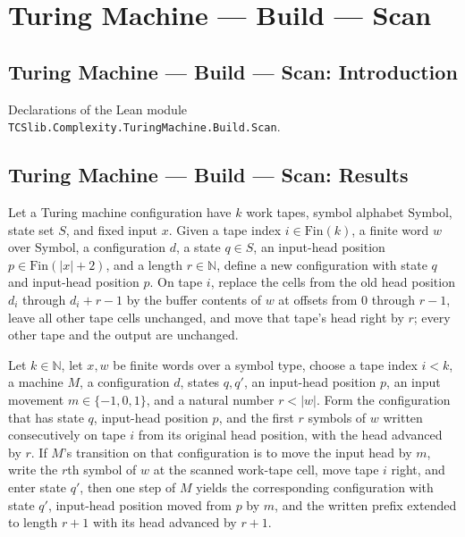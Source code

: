 \section{Turing Machine --- Build --- Scan}
\subsection*{Turing Machine --- Build --- Scan: Introduction}

Declarations of the Lean module \texttt{TCSlib.Complexity.TuringMachine.Build.Scan}.

\subsection*{Turing Machine --- Build --- Scan: Results}

\begin{definition}
\label{Turing.scanWriteCfg}
\leanok
{}
Let a Turing machine configuration have $k$ work tapes, symbol alphabet
$\mathrm{Symbol}$, state set $S$, and fixed input $x$. Given a tape index
$i\in\mathrm{Fin}(k)$, a finite word $w$ over $\mathrm{Symbol}$, a configuration $d$, a
state $q\in S$, an input-head position $p\in\mathrm{Fin}(|x|+2)$, and a length
$r\in\mathbb N$, define a new configuration with state $q$ and input-head position $p$.
On tape $i$, replace the cells from the old head position $d_i$ through $d_i+r-1$ by the
buffer contents of $w$ at offsets from $0$ through $r-1$, leave all other tape cells
unchanged, and move that tape's head right by $r$; every other tape and the output are
unchanged.
\end{definition}

\begin{theorem}
\label{Turing.scan_write_step}
\leanok
{}
Let $k\in\mathbb N$, let $x,w$ be finite words over a symbol type, choose a tape index
$i<k$, a machine $M$, a configuration $d$, states $q,q'$, an input-head position $p$, an
input movement $m\in\{-1,0,1\}$, and a natural number $r<|w|$. Form the configuration
that has state $q$, input-head position $p$, and the first $r$ symbols of $w$ written
consecutively on tape $i$ from its original head position, with the head advanced by
$r$. If $M$'s transition on that configuration is to move the input head by $m$, write
the $r$th symbol of $w$ at the scanned work-tape cell, move tape $i$ right, and enter
state $q'$, then one step of $M$ yields the corresponding configuration with state $q'$,
input-head position moved from $p$ by $m$, and the written prefix extended to length
$r+1$ with its head advanced by $r+1$.
\end{theorem}

